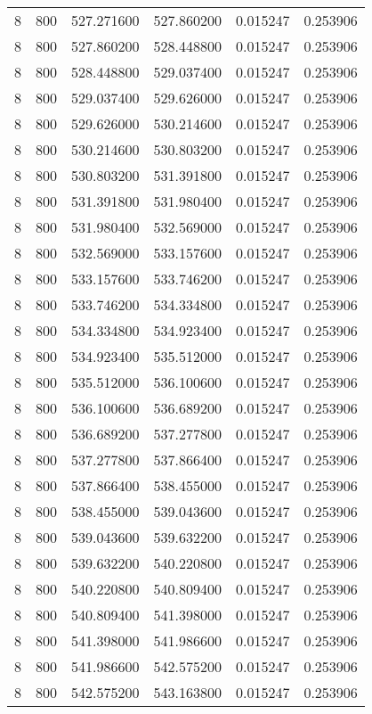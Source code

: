 \begin{longtable}{rrrrrr}
8 & 800 & 527.271600 & 527.860200 & 0.015247 & 0.253906 \\
8 & 800 & 527.860200 & 528.448800 & 0.015247 & 0.253906 \\
8 & 800 & 528.448800 & 529.037400 & 0.015247 & 0.253906 \\
8 & 800 & 529.037400 & 529.626000 & 0.015247 & 0.253906 \\
8 & 800 & 529.626000 & 530.214600 & 0.015247 & 0.253906 \\
8 & 800 & 530.214600 & 530.803200 & 0.015247 & 0.253906 \\
8 & 800 & 530.803200 & 531.391800 & 0.015247 & 0.253906 \\
8 & 800 & 531.391800 & 531.980400 & 0.015247 & 0.253906 \\
8 & 800 & 531.980400 & 532.569000 & 0.015247 & 0.253906 \\
8 & 800 & 532.569000 & 533.157600 & 0.015247 & 0.253906 \\
8 & 800 & 533.157600 & 533.746200 & 0.015247 & 0.253906 \\
8 & 800 & 533.746200 & 534.334800 & 0.015247 & 0.253906 \\
8 & 800 & 534.334800 & 534.923400 & 0.015247 & 0.253906 \\
8 & 800 & 534.923400 & 535.512000 & 0.015247 & 0.253906 \\
8 & 800 & 535.512000 & 536.100600 & 0.015247 & 0.253906 \\
8 & 800 & 536.100600 & 536.689200 & 0.015247 & 0.253906 \\
8 & 800 & 536.689200 & 537.277800 & 0.015247 & 0.253906 \\
8 & 800 & 537.277800 & 537.866400 & 0.015247 & 0.253906 \\
8 & 800 & 537.866400 & 538.455000 & 0.015247 & 0.253906 \\
8 & 800 & 538.455000 & 539.043600 & 0.015247 & 0.253906 \\
8 & 800 & 539.043600 & 539.632200 & 0.015247 & 0.253906 \\
8 & 800 & 539.632200 & 540.220800 & 0.015247 & 0.253906 \\
8 & 800 & 540.220800 & 540.809400 & 0.015247 & 0.253906 \\
8 & 800 & 540.809400 & 541.398000 & 0.015247 & 0.253906 \\
8 & 800 & 541.398000 & 541.986600 & 0.015247 & 0.253906 \\
8 & 800 & 541.986600 & 542.575200 & 0.015247 & 0.253906 \\
8 & 800 & 542.575200 & 543.163800 & 0.015247 & 0.253906 \\

\end{longtable}
